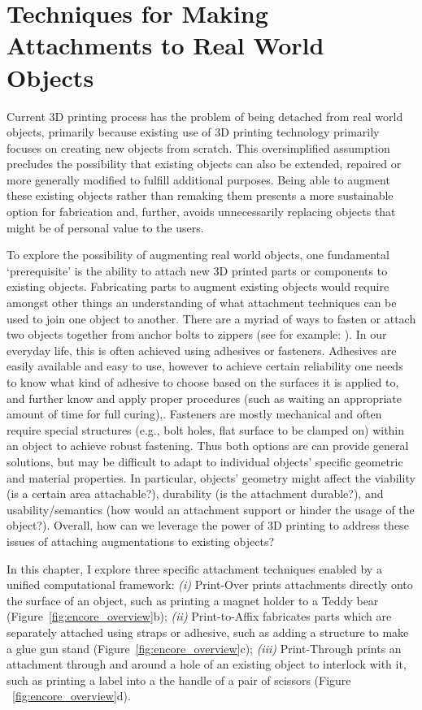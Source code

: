 \chapter{Techniques for Making Attachments to Real World Objects}
Current 3D printing process has the problem of being detached from real world objects, primarily because existing use of 3D printing technology primarily focuses on creating new objects from scratch. This oversimplified assumption precludes the possibility that existing objects can also be extended, repaired or more generally modified to fulfill additional purposes. Being able to augment these existing objects rather than remaking them presents a more sustainable option for fabrication and, further, avoids unnecessarily replacing objects that might be of personal value to the users.

To explore the possibility of augmenting real world objects, one fundamental `prerequisite' is the ability to attach new 3D printed parts or components to existing objects. Fabricating parts to augment existing objects would require amongst other things an understanding of what attachment techniques can be used to join one object to another. There are a myriad of ways to fasten or attach two objects together from anchor bolts to zippers (see for example: \cite{barrett1990fastener, wiki:Fastener}). In our everyday life, this is often achieved using adhesives or fasteners. Adhesives are easily available and easy to use, however to achieve certain reliability one needs to know what kind of adhesive to choose based on the surfaces it is applied to, and further know and apply proper procedures (such as waiting an appropriate amount of time for full curing),. Fasteners are mostly mechanical and often require special structures (e.g., bolt holes, flat surface to be clamped on) within an object to achieve robust fastening. Thus both options are can provide general solutions, but may be difficult to adapt to individual objects' specific geometric and material properties. In particular, objects' geometry might affect the viability (is a certain area attachable?), durability (is the attachment durable?), and usability/semantics (how would an attachment support or hinder the usage of the object?). Overall, how can we leverage the power of 3D printing to address these issues of attaching augmentations to existing objects?

In this chapter, I explore three specific attachment techniques enabled by a unified computational framework: {\em (i)} Print-Over prints attachments directly onto the surface of an object, such as printing a magnet holder to a Teddy bear (Figure~\ref{fig:encore_overview}b); {\em (ii)} Print-to-Affix fabricates parts which are separately attached using straps or adhesive, such as adding a structure to make a glue gun stand (Figure~\ref{fig:encore_overview}c); {\em (iii)} Print-Through prints an attachment through and around a hole of an existing object to interlock with it, such as printing a label into a the handle of a pair of scissors (Figure ~\ref{fig:encore_overview}d).

